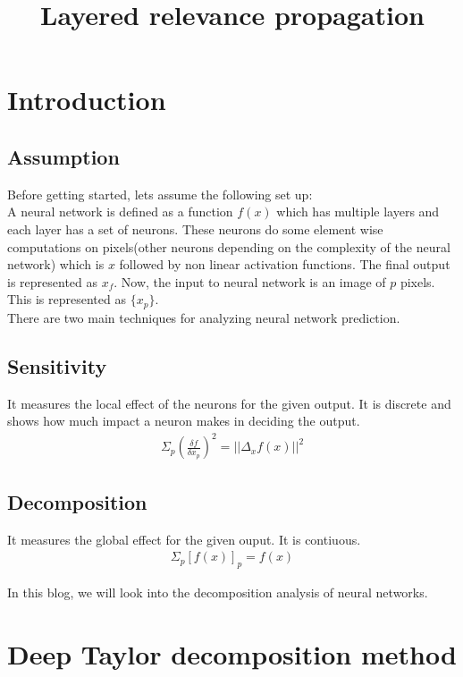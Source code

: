 \documentclass{article}
\title{Layered relevance propagation}
\begin{document}
	\maketitle
	\section{Introduction}
	\subsection*{Assumption}
	Before getting started, lets assume the following set up:\\
	A neural network is defined as a function $f(x)$ which has multiple layers and each layer has a set of neurons. These neurons do some element wise computations on pixels(other neurons depending on the complexity of the neural network) which is $x$ followed by non linear activation functions. The final output is represented as $x_{f}$.  Now, the input to neural network is an image of $p$ pixels. This is represented as $\{x_{p}\}$. \\
	 
	There are two main techniques for analyzing neural network prediction.
	\subsection{Sensitivity}
		It  measures the local effect of the neurons for the given output. It is discrete and shows how much impact a neuron makes in deciding the output. 
		\begin{align*}
			\Sigma_{p} (\frac{\delta f}{\delta x_{p}})^2 = \lvert \lvert \Delta_{x} f(x) \rvert \rvert^2
		\end{align*}
	\subsection{Decomposition}
		It measures the global effect for the given ouput. It is contiuous.
		\begin{align*}
			\Sigma_{p} [f(x)]_{p} = f(x)
		\end{align*}
	
	In this blog, we will look into the decomposition analysis of neural networks. 
	\section{Deep Taylor decomposition method}
	
\end{document}
